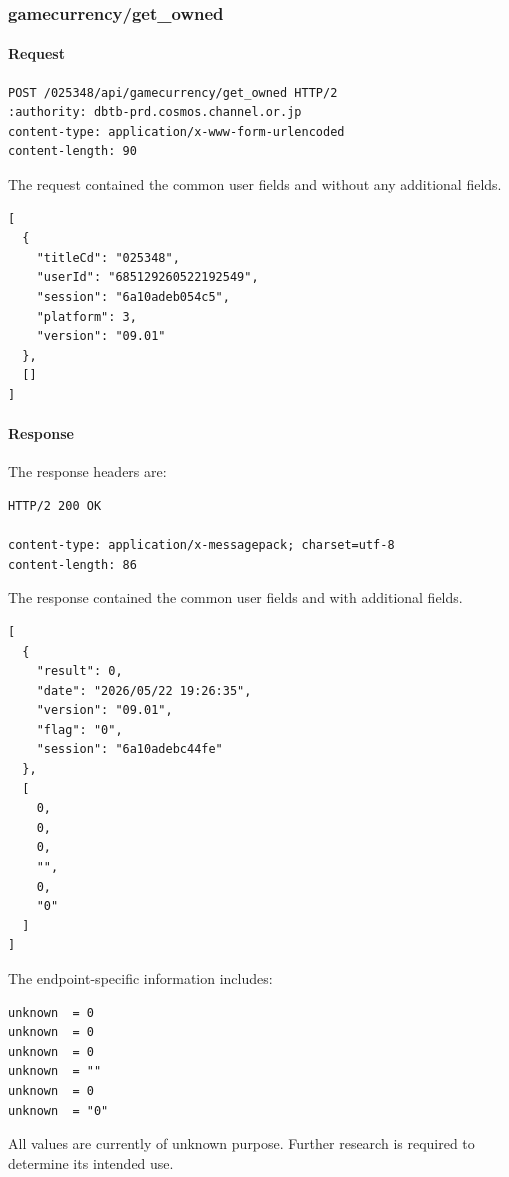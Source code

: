 \subsubsection{gamecurrency/get\_owned}
\label{subsec:api_gamecurrency_get_owned}

\paragraph{Request}

\begin{lstlisting}
POST /025348/api/gamecurrency/get_owned HTTP/2
:authority: dbtb-prd.cosmos.channel.or.jp
content-type: application/x-www-form-urlencoded
content-length: 90
\end{lstlisting}

The request contained the common user fields and without any additional fields.

\begin{lstlisting}
[
  {
    "titleCd": "025348",
    "userId": "685129260522192549",
    "session": "6a10adeb054c5",
    "platform": 3,
    "version": "09.01"
  },
  []
]
\end{lstlisting}

\newpage

\paragraph{Response}

The response headers are:

\begin{lstlisting}
HTTP/2 200 OK

content-type: application/x-messagepack; charset=utf-8
content-length: 86
\end{lstlisting}

The response contained the common user fields and with additional fields.

\begin{lstlisting}
[
  {
    "result": 0,
    "date": "2026/05/22 19:26:35",
    "version": "09.01",
    "flag": "0",
    "session": "6a10adebc44fe"
  },
  [
    0,
    0,
    0,
    "",
    0,
    "0"
  ]
]
\end{lstlisting}

The endpoint-specific information includes:

\begin{lstlisting}
unknown  = 0
unknown  = 0
unknown  = 0
unknown  = ""
unknown  = 0
unknown  = "0"
\end{lstlisting}

\begin{tcolorbox}[colback=yellow!10,colframe=orange!80!black,title=Warning]
All values are currently of unknown purpose.
Further research is required to determine its intended use.
\end{tcolorbox}

\newpage